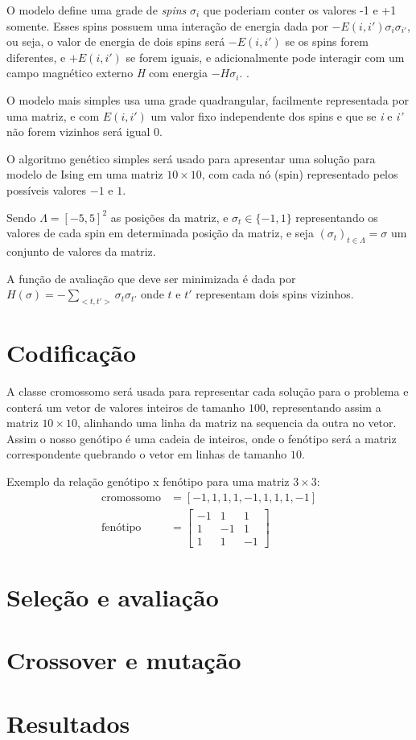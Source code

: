 O modelo define uma grade de \textit{spins} \(\sigma_i\) que poderiam conter os valores -1 e +1 somente. Esses spins possuem uma interação de energia dada por \(-E(i, i')\sigma_i\sigma_{i'}\), ou seja, o valor de energia de dois spins será \(-E(i, i')\) se os spins forem diferentes, e \(+E(i, i')\) se forem iguais, e adicionalmente pode interagir com um campo magnético externo \textit{H} com energia \(-H\sigma_i\). \cite{McCoy1973}.

O modelo mais simples usa uma grade quadrangular, facilmente representada por uma matriz, e com \(E(i, i')\) um valor fixo independente dos spins e que se \textit{i} e \textit{i'} não forem vizinhos será igual 0.



O algoritmo genético simples será usado para apresentar uma solução para modelo de Ising em uma matriz \(10 \times 10\), com cada nó (spin) representado pelos possíveis valores $-1$ e $1$. 

Sendo \(\Lambda = \left[-5,5\right]^2\) as posições da matriz, e \(\sigma_t \in \{-1,1\}\) representando os valores de cada spin em determinada posição da matriz, e seja \( (\sigma_t)_{t \in \Lambda} = \sigma \) um conjunto de valores da matriz. 

A função de avaliação que deve ser minimizada é dada por \( H(\sigma) = -\sum \limits_{<t,t'>}\sigma_t \sigma_{t'} \) onde $t$ e $t'$ representam dois spins vizinhos.   

\section{Codificação}

A classe cromossomo será usada para representar cada solução para o problema e conterá um vetor de valores inteiros de tamanho $100$, representando assim a matriz \( 10 \times 10 \), alinhando uma linha da matriz na sequencia da outra no vetor. Assim o nosso genótipo é uma cadeia de inteiros, onde o fenótipo será a matriz correspondente quebrando o vetor em linhas de tamanho $10$.

Exemplo da relação genótipo x fenótipo para uma matriz \( 3 \times 3 \):
\begin{align*}
\text{cromossomo} &= \left[-1, 1, 1, 1, -1, 1, 1, 1, -1 \right]\\
\text{fenótipo} &= \begin{bmatrix}
-1 & 1 & 1 \\
1 & -1 & 1 \\
1 & 1 & -1
\end{bmatrix}
\end{align*}


\section{Seleção e avaliação}

\section{Crossover e mutação}

\section{Resultados}